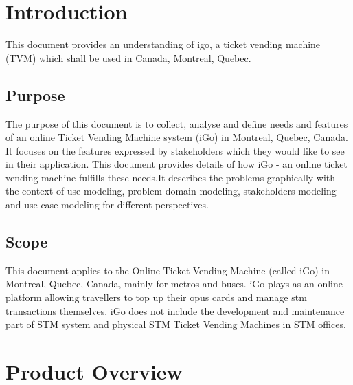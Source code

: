 \documentclass[11pt, english]{article}
\begin{document}
\newcommand{\CC}{C\nolinebreak\hspace{-.05em}\raisebox{.4ex}{\tiny\bf +}\nolinebreak\hspace{-.10em}\raisebox{.4ex}{\tiny\bf +}}
\def\CC{{C\nolinebreak[4]\hspace{-.05em}\raisebox{.4ex}{\tiny\bf ++}}}

\tableofcontents
\newpage
\section{Introduction}
This document provides an understanding of \gls{igo}, a ticket vending machine (TVM) which shall be used in Canada, Montreal, Quebec. 
\subsection{Purpose}
The purpose of this document is to collect, analyse and define needs and features of an online Ticket Vending Machine system (iGo) in Montreal, Quebec, Canada. It focuses on the features expressed by stakeholders which they would like to see in their application. This document provides details of how iGo - an online ticket vending machine fulfills these needs.It  describes the problems graphically with the context of use modeling, problem domain modeling, stakeholders modeling and use case modeling for different perspectives.
\subsection{Scope}
This document applies to the Online Ticket Vending Machine (called iGo)  in Montreal, Quebec, Canada, mainly for metros and buses. iGo plays as an online platform  allowing  travellers  to top up their \gls{opus} cards and manage \gls{stm} transactions themselves. iGo does not include the development and maintenance part of STM system and physical STM Ticket Vending Machines in STM offices.


\section{Product Overview}
\end{document}
